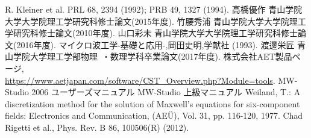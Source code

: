 \begin{thebibliography}{12}
   R. Kleiner et al. PRL 68, 2394 (1992); PRB 49, 1327 (1994).
   高橋優作 青山学院大学大学院理工学研究科修士論文(2015年度).
   竹腰秀浦 青山学院大学大学院理工学研究科修士論文(2010年度).
   山口彩未 青山学院大学大学院理工学研究科修士論文(2016年度).
   マイクロ波工学-基礎と応用-,岡田史明,学献社 (1993).
   渡邊栄匠 青山学院大学理工学部物理 ・数理学科卒業論文(2017年度).
   株式会社AET製品ページ,\\ \url{https://www.aetjapan.com/software/CST_Overview.php?Module=tools}.
   MW-Studio 2006 ユーザーズマニュアル
   MW-Studio 上級マニュアル
   Weiland, T.: A discretization method for the solution of Maxwell's equations for six-component fields:
Electronics and Communication, (AEÜ), Vol. 31, pp. 116-120, 1977.
   Chad Rigetti et al., Phys. Rev. B 86, 100506(R) (2012).
\end{thebibliography}
